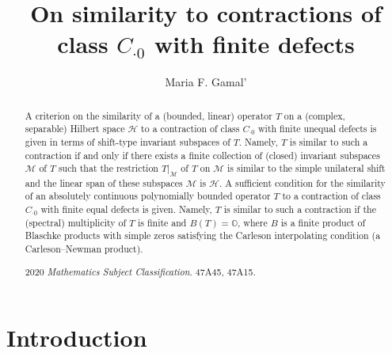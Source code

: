 \documentclass[a4paper,oneside,11pt]{amsart}
\numberwithin{equation}{section}
\theoremstyle{plain}
\theoremstyle{definition}
\begin{document}
\title[On similarity to contractions of class $C_{\cdot 0}$ with  finite defects]{On similarity to  contractions of class $C_{\cdot 0}$  with  finite defects}


\author{Maria F. Gamal'}
\address{
 St. Petersburg Branch\\ V. A. Steklov Institute 
of Mathematics\\
Russian Academy of Sciences\\ Fontanka 27, St. Petersburg\\ 
191023, Russia  
}





\begin{abstract}A criterion on the similarity of a (bounded, linear) operator $T$ 
on a (complex, separable) Hilbert space $\mathcal H$  to a contraction of 
class $C_{\cdot 0}$ with finite unequal defects is given in terms of 
shift-type invariant subspaces of $T$.  Namely, $T$ 
is similar to such a contraction if and only if there exists
a finite collection  of 
(closed) invariant subspaces $\mathcal M$ of $T$ 
 such that the restriction $T|_{\mathcal M}$ of $T$ on $\mathcal M$ is 
similar to the simple unilateral shift and 
 the linear span of these subspaces $\mathcal M$ is $\mathcal H$. 
 A sufficient condition for the similarity of an absolutely 
continuous polynomially bounded operator $T$ to a contraction of class 
$C_{\cdot 0}$ with finite equal defects is given. Namely, $T$ is 
similar to such a contraction if the (spectral) multiplicity of 
$T$ is finite and $B(T)=\mathbb O$, where $B$ is a finite 
product of Blaschke products with simple zeros satisfying the Carleson 
interpolating condition (a Carleson--Newman product).  



 

2020 \emph{Mathematics Subject Classification}. 47A45, 47A15.

 \end{abstract} 


\maketitle

\section{Introduction}
\end{document}
